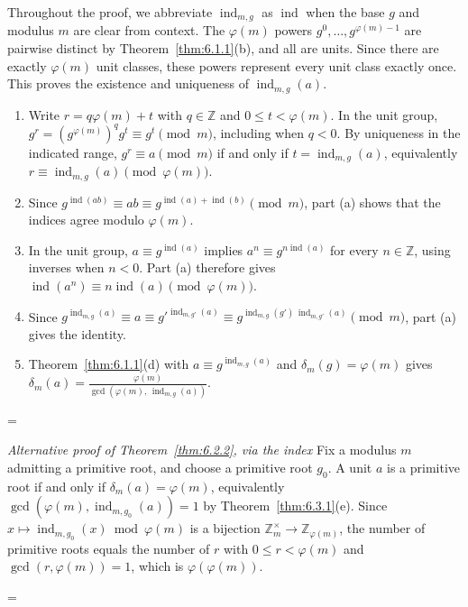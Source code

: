 \documentclass[11pt]{article}
\makeatletter
\let\nt@closedisplay\]
\def\nt@guardedclose{\@ifnextchar\par{\nt@closeafterpar}{\@ifnextchar\end{\postdisplaypenalty\@M\nt@closedisplay}{\nt@closedisplay}}}
\def\nt@closeafterpar\par{\@ifnextchar\par{\nt@closeafterpar}{\@ifnextchar\end{\postdisplaypenalty\@M\nt@closedisplay\par}{\nt@closedisplay\par}}}
\renewenvironment{proof}[1][\proofname]{\par
  \pushQED{\qed}\normalfont\topsep\medskipamount\edef\nt@afterproof{\@endparpenalty=\the\@endparpenalty\relax}\@beginparpenalty\@M\@endparpenalty\@M\let\]\nt@guardedclose\trivlist\item[]\textit{#1\@addpunct{.}} \ignorespaces}{\ifvmode\addpenalty\@M\fi\popQED\nt@afterproof\endtrivlist\@endpefalse}
\theoremstyle{ntstyle}
\newenvironment{altproof}[1][\proofname]
  {\begin{proof}[#1]\renewcommand{\qedsymbol}{}}{\end{proof}}
\newcommand{\ZmodUnits}[1]{\mathbb{Z}_{#1}^{\times}}
\DeclareMathOperator{\ind}{ind}
\makeatother
\begin{document}
\begin{proof} Throughout the proof, we abbreviate
  $\ind_{m,g}$ as $\ind$ when the base $g$
  and modulus $m$ are clear from context. The
  $\varphi(m)$ powers $g^{0},\ldots,g^{\varphi(m)-1}$ are pairwise
  distinct by Theorem~\ref{thm:6.1.1}(b), and all are units. Since there
  are exactly $\varphi(m)$ unit classes, these powers represent every
  unit class exactly once. This proves the existence and uniqueness of
  $\ind_{m,g}(a)$.

  \begin{enumerate}[label={\alph*)}]
    \item Write $r=q\varphi(m)+t$ with $q\in\mathbb{Z}$ and
          $0\le t<\varphi(m)$. In the unit group,
          $g^r=(g^{\varphi(m)})^qg^t\equiv g^t\pmod{m}$,
          including when $q<0$. By uniqueness in the indicated range,
          $g^r\equiv a\pmod{m}$ if and only if $t=\ind_{m,g}(a)$,
          equivalently $r\equiv\ind_{m,g}(a)\pmod{\varphi(m)}$.
    \item Since $g^{\ind(ab)} \equiv ab \equiv g^{\ind(a) + \ind(b)} \pmod{m}$, part (a) shows that the indices
          agree modulo $\varphi(m)$.
    \item In the unit group, $a\equiv g^{\ind(a)}$ implies
          $a^n\equiv g^{n\ind(a)}$ for every $n\in\mathbb{Z}$,
          using inverses when $n<0$. Part (a) therefore gives
          $\ind(a^n)\equiv n\ind(a)\pmod{\varphi(m)}$.
    \item Since $g^{\ind_{m,g}(a)} \equiv a \equiv g'^{\ind_{m,g'}(a)} \equiv g^{\ind_{m,g}(g')\, \ind_{m,g'}(a)} \pmod{m}$,
          part (a) gives the identity.
    \item Theorem~\ref{thm:6.1.1}(d) with $a \equiv g^{\ind_{m,g}(a)}$ and $\delta_m(g) = \varphi(m)$
          gives $\delta_m(a) = \tfrac{\varphi(m)}{\gcd(\varphi(m), \, \ind_{m,g}(a))}$.\qedhere
\end{enumerate}
\end{proof}

\begin{altproof}[Alternative proof of Theorem~\ref{thm:6.2.2}, via the index]
\label{proof:alt-6-2-2-2} Fix a modulus $m$ admitting a primitive root, and choose
  a primitive root $g_0$. A unit $a$ is a primitive root if and only if
  $\delta_m(a)=\varphi(m)$, equivalently
  $\gcd(\varphi(m),\ind_{m,g_0}(a))=1$ by Theorem~\ref{thm:6.3.1}(e). Since
  $x\mapsto\ind_{m,g_0}(x)\bmod\varphi(m)$ is a
  bijection $\ZmodUnits{m}\to\mathbb{Z}_{\varphi(m)}$, the
  number of primitive roots equals the number of $r$ with $0 \le r < \varphi(m)$ and $\gcd(r, \varphi(m)) = 1$,
  which is $\varphi(\varphi(m))$.

\end{altproof}
\end{document}
